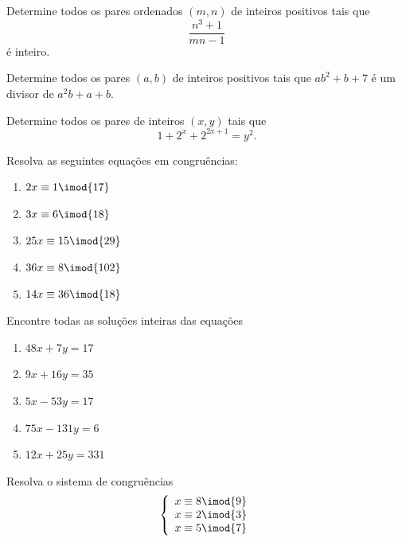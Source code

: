 \documentclass[10pt,a4paper]{article}
\begin{document}
	\begin{prob}[IMO 1994]
		Determine todos os pares ordenados $(m,n)$ de inteiros positivos tais que $$\dfrac{n^3+1}{mn-1}$$ é inteiro.
	\end{prob}

	\begin{prob}[IMO 1998]
		Determine todos os pares $(a,b)$ de inteiros positivos tais que $ab^2+b+7$ é um divisor de $a^2b+a+b$.
	\end{prob}

	\begin{prob}[IMO 2006]
		Determine todos os pares de inteiros $(x,y)$ tais que $$1+2^x+2^{2x+1}=y^2.$$
	\end{prob}

	\begin{prob}
		Resolva as seguintes equações em congruências:
		\begin{enumerate}[label = (\alph*)]
			\item $2x \equiv 1 \imod{17}$

			\item $3x \equiv 6 \imod{18}$

			\item $25x \equiv 15 \imod{29}$

			\item $36x \equiv 8 \imod{102}$

			\item  $14x \equiv 36 \imod{18}$
		\end{enumerate}
	\end{prob}

	\begin{prob} Encontre todas as soluções inteiras das equações 
		\begin{enumerate}[label = (\alph*)]
			\item $48x + 7y = 17$	

			\item $9x + 16y = 35$	

			\item $5x - 53y = 17$	

			\item $75x - 131y = 6$	

			\item $12x + 25y = 331$
		\end{enumerate}
	\end{prob}

	\begin{prob} Resolva o sistema de congruências
		\[ \left \{ \begin{array}{l}
			x \equiv 8 \imod{9}\\ 
			x \equiv 2 \imod{3} \\
			x \equiv 5 \imod{7} \\
		\end{array} \right. \]
	\end{prob}
\end{document}
